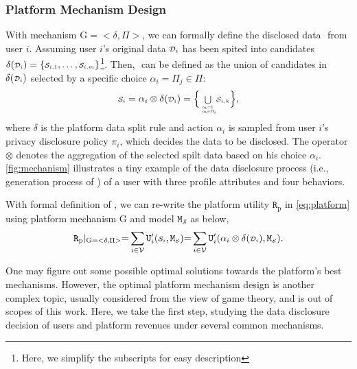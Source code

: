 
\subsubsection{\textbf{Platform Mechanism Design}}


With  mechanism $\mathrm{G}=<\delta,\Pi>$, we can formally define the disclosed data $\si{}$ from user $i$.
Assuming user $i$'s original data ${\scriptstyle \mathcal{D}_i}$ has been spited into candidates $\delta({\scriptstyle \mathcal{D}_i}) = \{{\scriptstyle \mathcal{S}_{i,1}}, \dots,{\scriptstyle \mathcal{S}_{i,m}}\}$\footnote{Here, we simplify the subscripts for easy description}. 
Then, $\si{}$ can be defined as the union of candidates in $\delta({\scriptstyle \mathcal{D}_i})$ selected  by a specific choice $ \alpha_i = \Pi_j \in \Pi$:
\begin{equation}
    \si{} = \alpha_i \otimes \mathrm{\delta}(\di{}) = \Bigl\{\scaleto{\bigcup_{\begin{subarray}{l}\,\,\, o_k=1\\\,\,\,  o_k \in \Pi_j\end{subarray}}}{20pt} {\scriptstyle \mathcal{S}_{i,k}} \Bigr\},
\label{eq:S_i}
\end{equation}
where $\delta$ is the platform data split rule and %
action $\alpha_i$ is sampled from user $i$'s privacy disclosure policy $\pi_i$, which decides the data to be disclosed. 
The operator $\otimes$ denotes the aggregation of the selected spilt data based on his choice $\alpha_i$.
\cref{fig:mechanism} illustrates a tiny example of the data disclosure process (i.e., generation process of $\si{}$) of a user with three profile attributes and four behaviors.


With formal definition of $\si{}$, we can  re-write the platform utility $\texttt{R}_{\text{p}}$ in \cref{eq:platform} using  platform mechanism $\mathrm{G}$ and model $\texttt{M}_{{\scriptscriptstyle \mathcal{S}}}$ as below,
\begin{align}
     \texttt{R}_{\text{p}} |_{\mathrm{G=<\delta,\Pi>}} {=}  \sum_{i \in \mathcal{V}} \texttt{U}_i'(\si{}, \texttt{M}_{{\scriptscriptstyle \mathcal{S}}}) {=}   \sum_{i \in \mathcal{V}} \texttt{U}_i'(\alpha_i \otimes \mathrm{\delta}(\di{}) , \texttt{M}_{{\scriptscriptstyle \mathcal{S}}}).%
    \label{eq:platform_mechanism_optimization}
\end{align} 

One may figure out some possible optimal solutions towards the platform's best mechanisms.
However, the optimal platform mechanism design is another complex topic, usually considered from the view of game theory, and is out of scopes of this work.
Here, we take the first step, studying the data disclosure decision of users and platform revenues under several common mechanisms.



